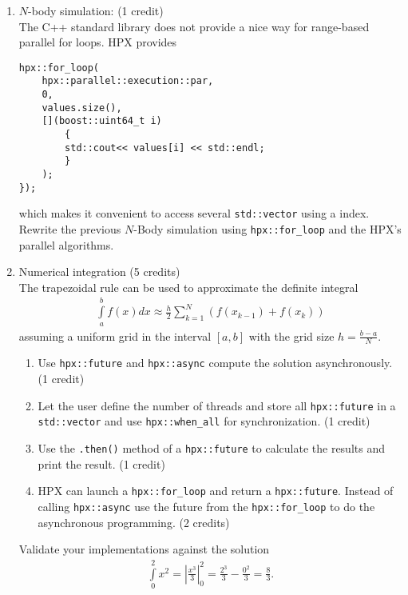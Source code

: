 \documentclass[11pt]{article}
\begin{document}
\begin{enumerate}

\item $N$-body simulation: (1 credit)\\
The C++ standard library does not provide a nice way for range-based parallel for loops. HPX provides
\begin{lstlisting}
hpx::for_loop(
	hpx::parallel::execution::par, 
	0, 
	values.size(),
	[](boost::uint64_t i)
		{
		std::cout<< values[i] << std::endl;
		}
	);
});
\end{lstlisting} 
which makes it convenient to access several \lstinline|std::vector| using a index. Rewrite the previous $N$-Body simulation using \lstinline|hpx::for_loop| and the HPX's parallel algorithms.

\item Numerical integration (5 credits)\\
The trapezoidal rule can be used to approximate the definite integral 
\begin{align*}
\int\limits_a^b f(x) dx \approx \frac{h}{2} \sum\limits_{k=1}^N (f(x_{k-1}) + f(x_k))
\end{align*}
assuming a uniform grid in the interval $[a,b]$ with the grid size $h=\frac{b-a}{N}$.
\begin{enumerate}
\item Use \lstinline|hpx::future| and \lstinline|hpx::async| compute the solution asynchronously. (1 credit)
\item Let the user define the number of threads and store all \lstinline|hpx::future| in a \lstinline|std::vector| and use \lstinline|hpx::when_all| for synchronization. (1 credit)
\item Use the \lstinline|.then()| method of a \lstinline|hpx::future| to calculate the results and print the result. (1 credit)
\item HPX can launch a \lstinline|hpx::for_loop| and return a \lstinline|hpx::future|. Instead of calling \lstinline|hpx::async| use the future from the \lstinline|hpx::for_loop| to do the asynchronous programming. (2 credits)  
\end{enumerate}
Validate your implementations against the solution 
\begin{align*}
\int\limits_0^2 x^2 = \left\vert \frac{x^3}{3}\right\vert_0^2 = \frac{2^3}{3} - \frac{0^2}{3} = \frac{8}{3}\text{.}
\end{align*}






\end{enumerate}
\doclicenseThis 
\end{document}
